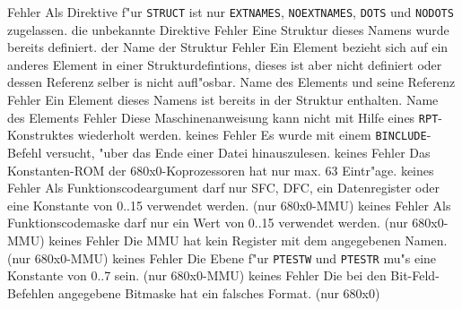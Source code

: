 \documentclass[12pt,a4paper,twoside]{report}
\newcommand{\tty}[1]{{\tt #1}}
\begin{document}
\begin{description}
               {Fehler}
               {Als Direktive f"ur \tty{STRUCT} ist nur
                \tty{EXTNAMES}, \tty{NOEXTNAMES}, \tty{DOTS} und
                \tty{NODOTS} zugelassen.}
               {die unbekannte Direktive}
               {Fehler}
               {Eine Struktur dieses Namens wurde bereits definiert.}
               {der Name der Struktur}
               {Fehler}
               {Ein Element bezieht sich auf ein anderes Element in
                einer Strukturdefintions, dieses ist aber nicht
                definiert oder dessen Referenz selber is nicht
                aufl"osbar.}
               {Name des Elements und seine Referenz}
               {Fehler}
               {Ein Element dieses Namens ist bereits in der Struktur
                enthalten.}
               {Name des Elements}
               {Fehler}
               {Diese Maschinenanweisung kann nicht mit Hilfe eines
                {\tt RPT}-Konstruktes wiederholt werden.}
               {keines}
               {Fehler}
               {Es wurde mit einem \tty{BINCLUDE}-Befehl versucht,
                "uber das Ende einer Datei hinauszulesen.}
               {keines}
               {Fehler}
               {Das Konstanten-ROM der 680x0-Koprozessoren hat
                nur max. 63 Eintr"age.}
               {keines}
               {Fehler}
               {Als Funktionscodeargument darf nur SFC, DFC, ein
                Datenregister oder eine Konstante von 0..15 verwendet
                werden. (nur 680x0-MMU)}
               {keines}
               {Fehler}
               {Als Funktionscodemaske darf nur ein Wert von
                0..15 verwendet werden. (nur 680x0-MMU)}
               {keines}
               {Fehler}
               {Die MMU hat kein Register mit dem angegebenen
                Namen. (nur 680x0-MMU)}
               {keines}
               {Fehler}
               {Die Ebene f"ur \tty{PTESTW} und \tty{PTESTR} mu"s eine
                Konstante von 0..7 sein. (nur 680x0-MMU)}
               {keines}
               {Fehler}
               {Die bei den Bit-Feld-Befehlen angegebene
                Bitmaske hat ein falsches Format. (nur 680x0)}

\end{description}
\end{document}
